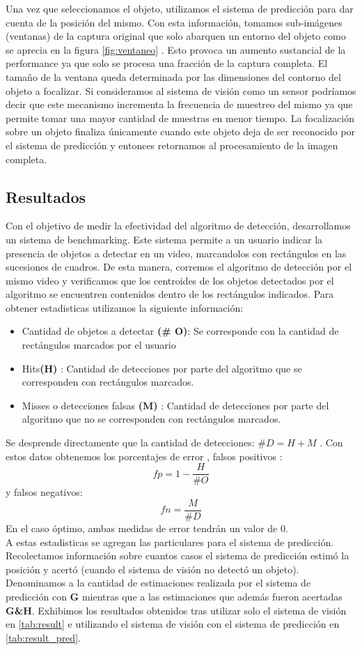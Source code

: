 	\indent Una vez que seleccionamos el objeto, utilizamos el sistema de predicción para dar cuenta de la posición del mismo. Con esta información, tomamos sub-imágenes (ventanas) de la captura original que solo abarquen un entorno del objeto como se aprecia en la figura \ref{fig:ventaneo} . Esto provoca un aumento sustancial de la performance ya que solo se procesa una fracción de la captura completa. El tamaño de la ventana queda determinada por las dimensiones del contorno del objeto a focalizar. Si consideramos al sistema de visión como un sensor podríamos decir que este mecanismo incrementa la frecuencia de muestreo del mismo ya que permite tomar una mayor cantidad de muestras en menor tiempo. La focalización sobre un objeto finaliza únicamente cuando este objeto deja de ser reconocido por el sistema de predicción y entonces retornamos al  procesamiento de la imagen completa. 


	
	
\subsection{Resultados}
Con el objetivo de  medir la efectividad del algoritmo de detección, desarrollamos un sistema de benchmarking. Este sistema permite
a un usuario indicar la presencia de objetos a detectar en un video, marcandolos con rectángulos en las sucesiones de cuadros. De esta
manera, corremos el algoritmo de detección por el mismo video y verificamos que los centroides de los objetos detectados por el algoritmo 
se encuentren contenidos dentro de los rectángulos indicados.  Para obtener estadisticas utilizamos la siguiente información:
\begin{itemize}
\item { Cantidad de objetos a detectar \textbf{(\# O)}: Se corresponde con la cantidad de rectángulos marcados por el usuario}
\item { Hits\textbf{(H)} : Cantidad de detecciones por parte del algoritmo que se corresponden con rectángulos marcados.}
\item { Misses o detecciones falsas \textbf{(M)} : Cantidad de detecciones por parte del algoritmo que no se corresponden con rectángulos marcados.}
\end{itemize}
Se desprende directamente que la cantidad de detecciones: $\#D=H+M$ .
Con estos datos obtenemos los porcentajes de error , falsos positivos : 
\[
	fp=1 - \frac{H}{\# O}
\]
y falsos negativos:
\[
	fn=\frac{M}{\# D}
\]
En el caso óptimo, ambas medidas de error tendrán un valor de $0$. \\
\indent A estas estadisticas se agregan las particulares para el sistema de predicción. Recolectamos información sobre
cuantos casos el sistema de predicción estimó la posición y acertó (cuando el sistema de visión no detectó un objeto). Denominamos
a la cantidad de estimaciones realizada por el sistema de predicción con \textbf{G} mientras que a las estimaciones que además fueron acertadas
\textbf{G\&H}. 
Exhibimos los resultados obtenidos tras utilizar solo el sistema de visión en \ref{tab:result} e utilizando el sistema de visión con el 
sistema de predicción en \ref{tab:result_pred}.

